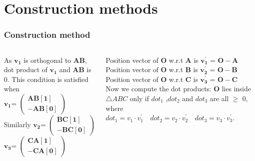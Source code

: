 \documentclass{beamer}
\renewcommand{\vec}[1]{\mathbf{#1}}
\begin{document}
\section*{Construction methods}
\begin{frame}[fragile]
\footnotesize
\frametitle{Construction method}
\begin{columns}
\begin{column}{0.5\textwidth}

As $\vec{v_1}$ is orthogonal to $\vec{AB}$, dot product of $\vec{v_1}$ and $\vec{AB}$ is 0.
This condition is satisfied when \\
$\vec{v_1}$= $\begin{pmatrix}\vec{AB[1]}\\\vec{-AB[0]}\end{pmatrix}$\\
Similarly $\vec{v_2}$= $\begin{pmatrix}\vec{BC[1]}\\\vec{-BC[0]}\end{pmatrix}$\quad\\
$\vec{v_3}$= $\begin{pmatrix}\vec{CA[1]}\\\vec{-CA[0]}\end{pmatrix}$\\
\end{column}
\begin{column}{0.5\textwidth}   
Position vector of $\vec{O}$ w.r.t $\vec{A}$ is $\vec{v_{1}^{'}}$ = $\vec{O-A}$\\
Position vector of $\vec{O}$ w.r.t $\vec{B}$ is $\vec{v_{2}^{'}}$ = $\vec{O-B}$\\
Position vector of $\vec{O}$ w.r.t $\vec{C}$ is $\vec{v_{3}^{'}}$ = $\vec{O-C}$\\
Now we compute the dot products: $\vec{O}$ lies inside $\triangle ABC$ only if $dot_1$ ,$dot_2$ and $dot_3$ are all $\geqslant$ 0, where $dot_1 = v_1 \cdot v_{1}^{'} \quad dot_2 = v_2 \cdot v_{2}^{'} \quad dot_3 = v_3 \cdot v_{3}^{'}$.



\end{column}
\end{columns}
\end{frame}
\end{document}
